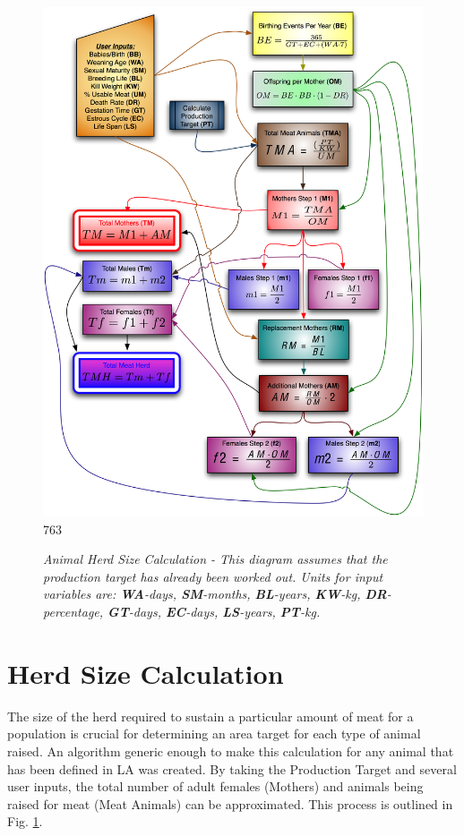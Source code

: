 \begin{figure}[htbp]
    \includegraphics[scale=.4]{./images/animalHerdSize.jpg}
763
    \caption[Animal Herd Size Calculation]{\label{fig:herdSize}\textit{Animal
Herd Size Calculation - This diagram assumes that the production target has
already been worked out.  Units for input variables are: \textbf{WA}-days,
\textbf{SM}-months, \textbf{BL}-years, \textbf{KW}-kg, \textbf{DR}-percentage,
\textbf{GT}-days, \textbf{EC}-days, \textbf{LS}-years, \textbf{PT}-kg.}}
\end{figure}

\section{Herd Size Calculation}
The size of the herd required to sustain a particular amount of meat for a
population is crucial for determining an area target for each type of animal
raised.  An algorithm generic enough to make this calculation for any animal
that has been defined in LA was created. By taking the Production
Target and several user inputs, the total number of adult females (Mothers) and
animals being raised for meat (Meat Animals) can be approximated. This process
is outlined in Fig. \ref{fig:herdSize}.

